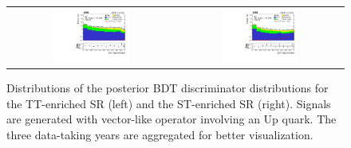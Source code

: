 \begin{figure}[tbh!]
 \begin{center}
 \begin{tabular}{cc}
  \includegraphics[width=0.48\textwidth]{figures/Part3/Results/BDT_TT_VecU}&
  \includegraphics[width=0.48\textwidth]{figures/Part3/Results/BDT_ST_VecU}\\
 \end{tabular}
 \caption{Distributions of the posterior BDT discriminator distributions for the TT-enriched SR (left) and the ST-enriched SR (right). Signals are generated with vector-like operator involving an Up quark. The three data-taking years are aggregated for better visualization.}
 \label{fig:bdt_postfit_VecU}
 \end{center}
\end{figure} 

